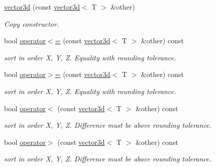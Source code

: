 \begin{DoxyCompactItemize}
\hyperlink{classirr_1_1core_1_1vector3d_a039600f48ce75c9eca6c0899135e60d5}{vector3d} (const \hyperlink{classirr_1_1core_1_1vector3d}{vector3d}$<$ T $>$ \&other)
\begin{DoxyCompactList}\small\item\em Copy constructor. \end{DoxyCompactList}\item 
\mbox{\label{classirr_1_1core_1_1vector3d_a57c48c162085c20e19be6630551bde0a}} 
bool \hyperlink{classirr_1_1core_1_1vector3d_a57c48c162085c20e19be6630551bde0a}{operator$<$=} (const \hyperlink{classirr_1_1core_1_1vector3d}{vector3d}$<$ T $>$ \&other) const
\begin{DoxyCompactList}\small\item\em sort in order X, Y, Z. Equality with rounding tolerance. \end{DoxyCompactList}\item 
\mbox{\label{classirr_1_1core_1_1vector3d_a875266ef671a17b2e6646aeeaaa362d4}} 
bool \hyperlink{classirr_1_1core_1_1vector3d_a875266ef671a17b2e6646aeeaaa362d4}{operator$>$=} (const \hyperlink{classirr_1_1core_1_1vector3d}{vector3d}$<$ T $>$ \&other) const
\begin{DoxyCompactList}\small\item\em sort in order X, Y, Z. Equality with rounding tolerance. \end{DoxyCompactList}\item 
\mbox{\label{classirr_1_1core_1_1vector3d_a351356db0565148c5d50da21a8509dc8}} 
bool \hyperlink{classirr_1_1core_1_1vector3d_a351356db0565148c5d50da21a8509dc8}{operator$<$} (const \hyperlink{classirr_1_1core_1_1vector3d}{vector3d}$<$ T $>$ \&other) const
\begin{DoxyCompactList}\small\item\em sort in order X, Y, Z. Difference must be above rounding tolerance. \end{DoxyCompactList}\item 
\mbox{\label{classirr_1_1core_1_1vector3d_adbbef0f4f396dc128c694631df71e18a}} 
bool \hyperlink{classirr_1_1core_1_1vector3d_adbbef0f4f396dc128c694631df71e18a}{operator$>$} (const \hyperlink{classirr_1_1core_1_1vector3d}{vector3d}$<$ T $>$ \&other) const
\begin{DoxyCompactList}\small\item\em sort in order X, Y, Z. Difference must be above rounding tolerance. \end{DoxyCompactList}\item 

\end{DoxyCompactItemize}
